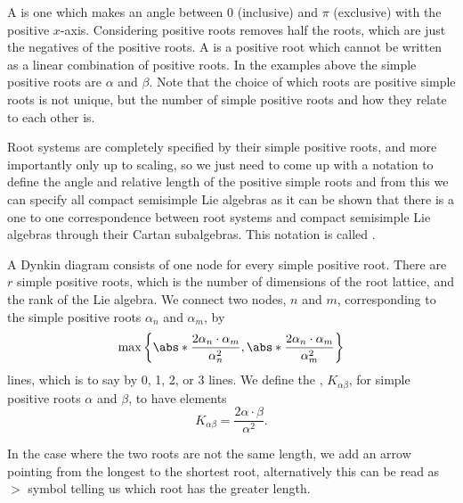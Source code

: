\documentclass[fleqn]{NotesClass}
\begin{document}
    A  is one which makes an angle between \(0\) (inclusive) and \(\pi\) (exclusive) with the positive \(x\)-axis.
    Considering positive roots removes half the roots, which are just the negatives of the positive roots.
    A  is a positive root which cannot be written as a linear combination of positive roots.
    In the examples above the simple positive roots are \(\alpha\) and \(\beta\).
    Note that the choice of which roots are positive simple roots is not unique, but the number of simple positive roots and how they relate to each other is.
    
    Root systems are completely specified by their simple positive roots, and more importantly only up to scaling, so we just need to come up with a notation to define the angle and relative length of the positive simple roots and from this we can specify all compact semisimple Lie algebras as it can be shown that there is a one to one correspondence between root systems and compact semisimple Lie algebras through their Cartan subalgebras.
    This notation is called .
    
    A Dynkin diagram consists of one node for every simple positive root.
    There are \(r\) simple positive roots, which is the number of dimensions of the root lattice, and the rank of the Lie algebra.
    We connect two nodes, \(n\) and \(m\), corresponding to the simple positive roots \(\alpha_n\) and \(\alpha_m\), by
    \begin{equation}
        \max\left\{ \abs*{\frac{2\alpha_n \cdot \alpha_m}{\alpha_n^2}}, \abs*{\frac{2\alpha_n \cdot \alpha_m}{\alpha_m^2}} \right\}
    \end{equation}
    lines, which is to say by 0, 1, 2, or 3 lines.
    We define the , \(K_{\alpha\beta}\), for simple positive roots \(\alpha\) and \(\beta\), to have elements
    \begin{equation}
        K_{\alpha\beta} = \frac{2\alpha \cdot \beta}{\alpha^2}.
    \end{equation}
    
    
    In the case where the two roots are not the same length, we add an arrow pointing from the longest to the shortest root, alternatively this can be read as \(>\) symbol telling us which root has the greater length.
    
\end{document}
